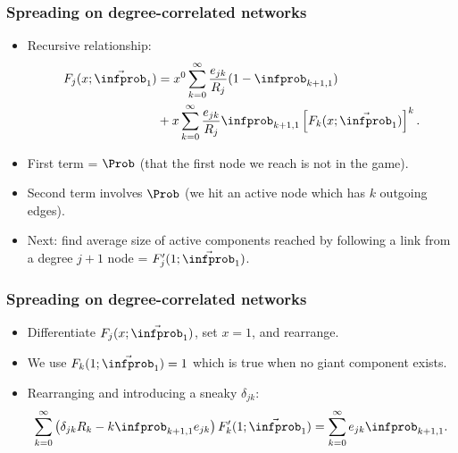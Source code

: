 \begin{frame}
  \frametitle{Spreading on degree-correlated networks}

  \begin{itemize}
  \item Recursive relationship:
    \begin{align}
      \nonumber
      F_j(x;\vec{\infprob}_1)
      & =
      x^{0}
      \sum_{k=0}^{\infty} 
      \frac{e_{jk}}{R_j}
      ( 1 - \infprob_{k+1,1} )
      \\ 
      \nonumber
      & +
      x
      \sum_{k=0}^{\infty} 
      \frac{e_{jk}}{R_j}
      \infprob_{k+1,1}
      \left[
        F_k(x;\vec{\infprob}_1)
      \right]^k.
    \end{align}
  \item<2->
    \alert{First term} =
    $\Prob$ (that the first node we reach is not in the game).
  \item<3->
    \alert{Second term} involves
    $\Prob$ (we hit an active node which has $k$ outgoing edges).
  \item<4->
    Next: find average size of active components reached
    by following a link from a degree $j+1$ node = $F_{j}'(1;\vec{\infprob}_1)$.
  \end{itemize}

\end{frame}


\begin{frame}
  \frametitle{Spreading on degree-correlated networks}

  \begin{itemize}
  \item<1->
    Differentiate $F_{j}(x;\vec{\infprob}_1)$,
    set $x=1$, and rearrange.
  \item<2->
    We use $F_k(1;\vec{\infprob}_1)=1$ which
    is true when no giant component exists.
    \item<4->
      Rearranging and introducing a sneaky $\delta_{jk}$:
      $$
      \sum_{k=0}^\infty
      \left(
        \delta_{jk} R_k 
        -
        k \infprob_{k+1,1} e_{jk}
      \right)
      F_k'(1;\vec{\infprob}_1)
      =
      \sum_{k=0}^{\infty}
      e_{jk}
      \infprob_{k+1,1}.
      $$
  \end{itemize}
  
\end{frame}


